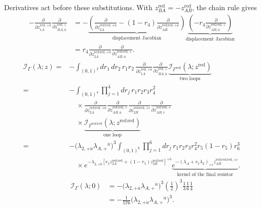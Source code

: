 \documentclass[11pt]{article}
\numberwithin{equation}{section}
\numberwithin{figure}{section}
\numberwithin{table}{section}
\begin{document}
Derivatives act before these substitutions. With $z_{BA}^{\mathrm{red}}=-z_{AB}^{\mathrm{red}}$, the chain rule gives
\begin{equation*}
\begin{aligned}
-
\frac{\partial}{\partial z_{1A}^{\mathrm{red},+\dot a}}
\frac{\partial}{\partial z_{BA,\dot a}^{\mathrm{red},+}}
&=-
\underbrace{\left(
\frac{\partial}{\partial z_{2A}^{\mathrm{red\,red},+\dot a}}
-(1-r_4)\frac{\partial}{\partial z_{AB}^{\mathrm{red\,red},+\dot a}}
\right)}_{\text{displacement Jacobian}}
\underbrace{\left(-r_4\frac{\partial}{\partial z_{AB,\dot a}^{\mathrm{red\,red},+}}\right)}_{\text{displacement Jacobian}}\\
&=r_4
\frac{\partial}{\partial z_{2A}^{\mathrm{red\,red},+\dot a}}
\frac{\partial}{\partial z_{AB,\dot a}^{\mathrm{red\,red},+}}.
\end{aligned}
\end{equation*}
\begin{equation*}
\begin{aligned}
\mathcal I_\Gamma(\lambda;z)
={}&-\int_{(0,1)^2}dr_1\,dr_2\,r_1r_2\,
\frac{\partial}{\partial z_{1A}^{\mathrm{red},+\dot a}}
\frac{\partial}{\partial z_{BA,\dot a}^{\mathrm{red},+}}
\underbrace{\mathcal I_{\Gamma^{\mathrm{red}}}
(\lambda;z^{\mathrm{red}})}_{\text{two loops}}\\
={}&-\int_{(0,1)^4}\prod_{j=1}^4dr_j\,r_1r_2r_3r_4^2\,\\
&\quad\times
\frac{\partial}{\partial z_{2A}^{\mathrm{red\,red},+\dot a}}
\frac{\partial}{\partial z_{AB,\dot a}^{\mathrm{red\,red},+}}
\frac{\partial}{\partial z_{2B}^{\mathrm{red\,red},+\dot c}}
\frac{\partial}{\partial z_{AB,\dot c}^{\mathrm{red\,red},+}}
\\
&\quad\times\underbrace{\mathcal I_{\Gamma^{\mathrm{red\,red}}}
(\lambda;z^{\mathrm{red\,red}})}_{\text{one loop}}\\
={}&-\bigl(\lambda_{2,+\dot a}\lambda_{A,+}{}^{\dot a}\bigr)^3
\int_{(0,1)^6}\prod_{j=1}^6dr_j\,
 r_1r_2r_3r_4^2r_5(1-r_5)r_6^3\\
&\quad\times e^{-\lambda_{2,+\dot b}
\left[r_5z^{\mathrm{red\,red}}_{2A}+(1-r_5)z^{\mathrm{red\,red}}_{2B}\right]^{+\dot b}}
\underbrace{e^{-(\lambda_A+r_5\lambda_2)_{+\dot c}
 z_{AB}^{\mathrm{red\,red\,red},+\dot c}}}_{\text{kernel of the final resistor}}.
\end{aligned}
\end{equation*}
\begin{equation*}
\begin{aligned}
\mathcal I_\Gamma(\lambda;0)
&=-\bigl(\lambda_{2,+\dot a}\lambda_{A,+}{}^{\dot a}\bigr)^3
\left(\frac12\right)^3\frac13\frac16\frac14\\
&=-\frac1{576}\bigl(\lambda_{2,+\dot a}\lambda_{A,+}{}^{\dot a}\bigr)^3.
\end{aligned}
\end{equation*}
\end{document}
